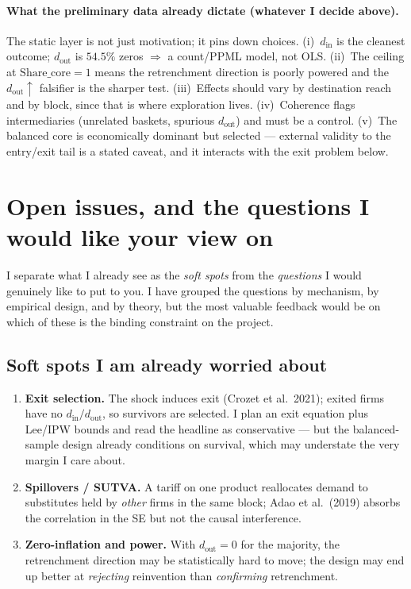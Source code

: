 \documentclass[11pt]{article}
\newcommand{\din}{d_{\mathrm{in}}}
\newcommand{\dout}{d_{\mathrm{out}}}
\newcommand{\sharecore}{\mathrm{Share\_core}}
\begin{document}
\paragraph{What the preliminary data already dictate (whatever I decide above).} The static
layer is not just motivation; it pins down choices. (i)~$\din$ is the cleanest outcome;
$\dout$ is $54.5\%$ zeros $\Rightarrow$ a count/PPML model, not OLS. (ii)~The ceiling at
$\sharecore=1$ means the retrenchment direction is poorly powered and the
$\dout\!\uparrow$ falsifier is the sharper test. (iii)~Effects should vary by destination
reach and by block, since that is where exploration lives. (iv)~Coherence flags
intermediaries (unrelated baskets, spurious $\dout$) and must be a control. (v)~The
balanced core is economically dominant but selected --- external validity to the
entry/exit tail is a stated caveat, and it interacts with the exit problem below.

\section{Open issues, and the questions I would like your view on}
\label{sec:questions}

I separate what I already see as the \emph{soft spots} from the \emph{questions} I would
genuinely like to put to you. I have grouped the questions by mechanism, by empirical
design, and by theory, but the most valuable feedback would be on which of these is the
binding constraint on the project.

\subsection*{Soft spots I am already worried about}
\begin{enumerate}[leftmargin=1.5em]
  \item \textbf{Exit selection.} The shock induces exit (Crozet et al.\ 2021); exited
        firms have no $\din/\dout$, so survivors are selected. I plan an exit equation
        plus Lee/IPW bounds and read the headline as conservative --- but the balanced-%
        sample design already conditions on survival, which may understate the very
        margin I care about.
  \item \textbf{Spillovers / SUTVA.} A tariff on one product reallocates demand to
        substitutes held by \emph{other} firms in the same block; Adao et al.\ (2019)
        absorbs the correlation in the SE but not the causal interference.
  \item \textbf{Zero-inflation and power.} With $\dout=0$ for the majority, the
        retrenchment direction may be statistically hard to move; the design may end up
        better at \emph{rejecting} reinvention than \emph{confirming} retrenchment.
\end{enumerate}
\end{document}
